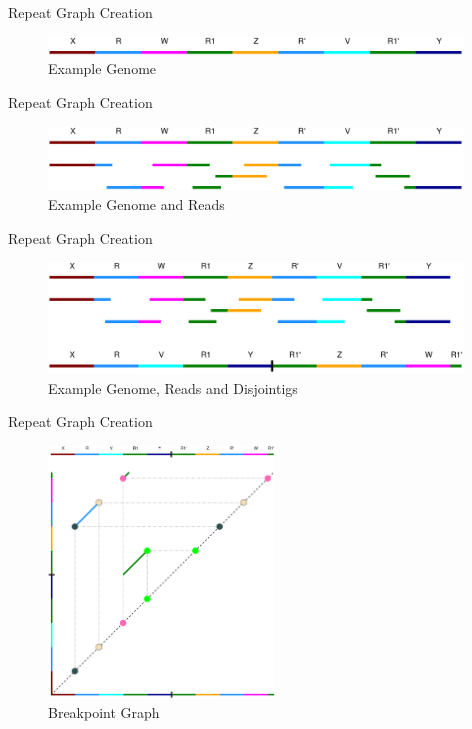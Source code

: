 \documentclass{beamer}
\begin{document}
  \begin{frame}{Repeat Graph Creation}
    \begin{figure}
      \includegraphics[width=11cm]{images/genome.png}
      \caption{Example Genome}
      \label{fig:genome}
    \end{figure}
  \end{frame}

  \begin{frame}{Repeat Graph Creation}
    \begin{figure}
      \includegraphics[width=11cm]{images/genome_and_reads.png}
      \caption{Example Genome and Reads}
      \label{fig:genome_and_reads}
    \end{figure}
  \end{frame}

  \begin{frame}{Repeat Graph Creation}
    \begin{figure}
      \includegraphics[width=11cm]{images/disjointigs.png}
      \caption{Example Genome, Reads and Disjointigs}
      \label{fig:disjointigs}
    \end{figure}
  \end{frame}

  \begin{frame}{Repeat Graph Creation}
    \begin{figure}
      \includegraphics[width=6cm]{images/dot_plot.png}
      \caption{Breakpoint Graph}
      \label{fig:bp_graph}
    \end{figure}
  \end{frame}
\end{document}
